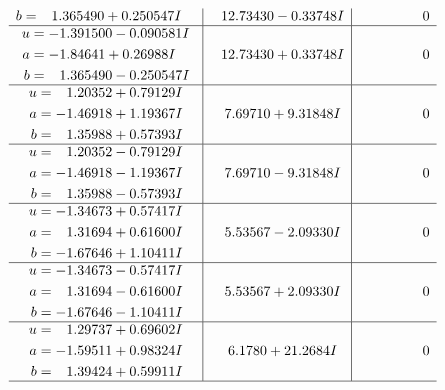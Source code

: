 \documentclass[1p]{elsarticle_modified}
\theoremstyle{definition}
\begin{document}
$$\begin{array}{c|c|c}
\begin{aligned}
b &= \phantom{-}1.365490 + 0.250547 I\end{aligned}
 & \phantom{-}12.73430 - 0.33748 I & \phantom{-0.000000 } 0 \\ \hline\begin{aligned}
u &= -1.391500 - 0.090581 I \\
a &= -1.84641 + 0.26988 I \\
b &= \phantom{-}1.365490 - 0.250547 I\end{aligned}
 & \phantom{-}12.73430 + 0.33748 I & \phantom{-0.000000 } 0 \\ \hline\begin{aligned}
u &= \phantom{-}1.20352 + 0.79129 I \\
a &= -1.46918 + 1.19367 I \\
b &= \phantom{-}1.35988 + 0.57393 I\end{aligned}
 & \phantom{-}7.69710 + 9.31848 I & \phantom{-0.000000 } 0 \\ \hline\begin{aligned}
u &= \phantom{-}1.20352 - 0.79129 I \\
a &= -1.46918 - 1.19367 I \\
b &= \phantom{-}1.35988 - 0.57393 I\end{aligned}
 & \phantom{-}7.69710 - 9.31848 I & \phantom{-0.000000 } 0 \\ \hline\begin{aligned}
u &= -1.34673 + 0.57417 I \\
a &= \phantom{-}1.31694 + 0.61600 I \\
b &= -1.67646 + 1.10411 I\end{aligned}
 & \phantom{-}5.53567 - 2.09330 I & \phantom{-0.000000 } 0 \\ \hline\begin{aligned}
u &= -1.34673 - 0.57417 I \\
a &= \phantom{-}1.31694 - 0.61600 I \\
b &= -1.67646 - 1.10411 I\end{aligned}
 & \phantom{-}5.53567 + 2.09330 I & \phantom{-0.000000 } 0 \\ \hline\begin{aligned}
u &= \phantom{-}1.29737 + 0.69602 I \\
a &= -1.59511 + 0.98324 I \\
b &= \phantom{-}1.39424 + 0.59911 I\end{aligned}
 & \phantom{-}6.1780 + 21.2684 I & \phantom{-0.000000 } 0\\
 \hline 
 \end{array}$$\newpage$$\begin{array}{c|c|c}  

\end{array}$$
\end{document}
